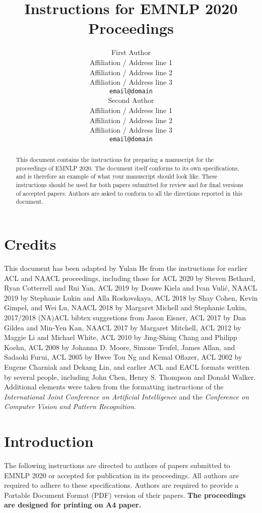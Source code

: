 \documentclass[11pt,a4paper]{article}
\title{Instructions for EMNLP 2020 Proceedings}
\author{First Author \\
  Affiliation / Address line 1 \\
  Affiliation / Address line 2 \\
  Affiliation / Address line 3 \\
  \texttt{email@domain} \\\And
  Second Author \\
  Affiliation / Address line 1 \\
  Affiliation / Address line 2 \\
  Affiliation / Address line 3 \\
  \texttt{email@domain} \\}
\date{}
\begin{document}
\maketitle
\begin{abstract}
This document contains the instructions for preparing a manuscript for the proceedings of EMNLP 2020.
The document itself conforms to its own specifications, and is therefore an example of what your manuscript should look like.
These instructions should be used for both papers submitted for review and for final versions of accepted papers.
Authors are asked to conform to all the directions reported in this document.
\end{abstract}

\section{Credits}

This document has been adapted by Yulan He
from the instructions for earlier ACL and NAACL proceedings, including those for 
ACL 2020 by Steven Bethard, Ryan Cotterrell and Rui Yan, 
ACL 2019 by Douwe Kiela and Ivan Vuli\'{c},
NAACL 2019 by Stephanie Lukin and Alla Roskovskaya, 
ACL 2018 by Shay Cohen, Kevin Gimpel, and Wei Lu, 
NAACL 2018 by Margaret Michell and Stephanie Lukin,
2017/2018 (NA)ACL bibtex suggestions from Jason Eisner,
ACL 2017 by Dan Gildea and Min-Yen Kan, 
NAACL 2017 by Margaret Mitchell, 
ACL 2012 by Maggie Li and Michael White, 
ACL 2010 by Jing-Shing Chang and Philipp Koehn, 
ACL 2008 by Johanna D. Moore, Simone Teufel, James Allan, and Sadaoki Furui, 
ACL 2005 by Hwee Tou Ng and Kemal Oflazer, 
ACL 2002 by Eugene Charniak and Dekang Lin, 
and earlier ACL and EACL formats written by several people, including
John Chen, Henry S. Thompson and Donald Walker.
Additional elements were taken from the formatting instructions of the \emph{International Joint Conference on Artificial Intelligence} and the \emph{Conference on Computer Vision and Pattern Recognition}.

\section{Introduction}

The following instructions are directed to authors of papers submitted to EMNLP 2020 or accepted for publication in its proceedings.
All authors are required to adhere to these specifications.
Authors are required to provide a Portable Document Format (PDF) version of their papers.
\textbf{The proceedings are designed for printing on A4 paper.}
\end{document}
